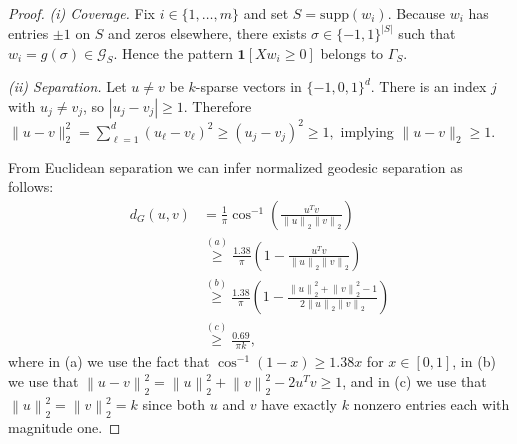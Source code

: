 \documentclass[10pt,a4paper]{amsart}
\newcommand{\twonorm}[1]{\left\|#1\right\|_{2}}
\begin{document}
\begin{proof}
\textit{(i) Coverage.}
Fix \(i\in\{1,\dots ,m\}\) and set \(S=\text{supp}(w_{i})\).
Because \(w_{i}\) has entries \(\pm1\) on \(S\) and zeros elsewhere,
there exists \(\sigma\in\{-1,1\}^{|S|}\) such that \(w_{i}=g(\sigma)\in\mathcal G_{S}\).
Hence the pattern \(\mathbf 1[Xw_{i}\ge 0]\) belongs to
\(\Gamma_{S}\). 


\medskip
\noindent
\textit{(ii) Separation.}
Let \(u\neq v\) be \(k\)-sparse vectors in \(\{-1,0,1\}^{d}\).
There is an index \(j\) with \(u_{j}\neq v_{j}\),
so \(|u_{j}-v_{j}|\ge 1\).
Therefore
\(
\lVert u-v\rVert_{2}^{2}
=\sum_{\ell=1}^{d}(u_{\ell}-v_{\ell})^{2}
\ge (u_{j}-v_{j})^{2}\ge 1,
\)
implying \(\lVert u-v\rVert_{2}\ge 1\).

From Euclidean separation we can infer normalized geodesic separation as follows:
\begin{align*}
    d_G(u, v) &= \frac{1}{\pi}\cos^{-1}\left(\frac{u^Tv}{\twonorm{u}\twonorm{v}} \right) \\
    &\overset{(a)}{\geq} \frac{1.38}{\pi}\left(1-\frac{u^Tv}{\twonorm{u}\twonorm{v}} \right) \\
    &\overset{(b)}{\geq} \frac{1.38}{\pi}\left(1-\frac{\twonorm{u}^2 + \twonorm{v}^2 - 1}{2\twonorm{u}\twonorm{v}} \right) \\
    &\overset{(c)}{\geq} \frac{0.69}{\pi k}  ,
\end{align*}
where in (a) we use the fact that $\cos^{-1}(1-x) \geq 1.38x$ for $x \in [0,1]$, in (b) we use that $\twonorm{u-v}^2 = \twonorm{u}^2 + \twonorm{v}^2 - 2u^Tv \geq 1$, and in (c) we use that $\twonorm{u}^2 = \twonorm{v}^2 = k$ since both $u$ and $v$ have exactly $k$ nonzero entries each with magnitude one.
\end{proof}
\end{document}
